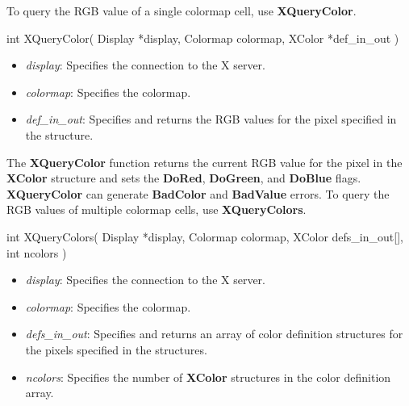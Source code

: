 \documentclass{report}
\begin{document}
\begin{itemize}
            \bigbreak \noindent
            To query the RGB value of a single colormap cell, use \textbf{XQueryColor}.
            \bigbreak \noindent
            \begin{cppcode}
                int XQueryColor(
                    Display *display,
                    Colormap colormap,
                    XColor *def_in_out
                )
            \end{cppcode}
            \bigbreak \noindent
            \begin{itemize}
                \item \textit{display}: Specifies the connection to the X server.
                \item \textit{colormap}: Specifies the colormap.
                \item \textit{def\_in\_out}: Specifies and returns the RGB values for the pixel specified in the structure.
            \end{itemize}
            \noindent
            The \textbf{XQueryColor} function returns the current RGB value for the pixel in the \textbf{XColor} structure and sets the \textbf{DoRed}, \textbf{DoGreen}, and \textbf{DoBlue} flags.
            \bigbreak \noindent
            \textbf{XQueryColor} can generate \textbf{BadColor} and \textbf{BadValue} errors.
            \bigbreak \noindent
            To query the RGB values of multiple colormap cells, use \textbf{XQueryColors}.
            \bigbreak \noindent 
            \begin{cppcode}
                int XQueryColors(
                    Display *display,
                    Colormap colormap,
                    XColor defs_in_out[],
                    int ncolors
                )
            \end{cppcode}
            \bigbreak \noindent
            \begin{itemize}
                \item \textit{display}: Specifies the connection to the X server.
                \item \textit{colormap}: Specifies the colormap.
                \item \textit{defs\_in\_out}: Specifies and returns an array of color definition structures for the pixels specified in the structures.
                \item \textit{ncolors}: Specifies the number of \textbf{XColor} structures in the color definition array.
            \end{itemize}
            \noindent

\end{itemize}
\end{document}
